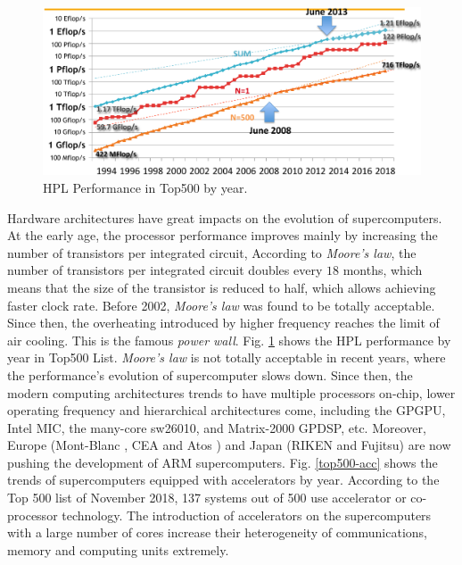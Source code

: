 \begin{figure}[t]
	\centering
	\includegraphics[width=0.99\linewidth]{fig/top500_2.pdf}
	\caption{HPL Performance in Top500 by year.}
	\label{hpc_evaluate}
\end{figure}

Hardware architectures have great impacts on the evolution of supercomputers. At the early age, the processor performance improves mainly by increasing the number of transistors per integrated circuit, According to \textit{Moore's law}, the number of transistors per integrated circuit doubles every $18$ months, which means that the size of the transistor is reduced to half, which allows achieving faster clock rate. Before 2002, \textit{Moore's law} was found to be totally acceptable. Since then, the overheating introduced by higher frequency reaches the limit of air cooling. This is the famous \textit{power wall}. Fig. \ref{hpc_evaluate} shows the HPL performance by year in Top500 List. \textit{Moore's law} is not totally acceptable in recent years, where the performance's evolution of supercomputer slows down. Since then, the modern computing architectures  trends to have multiple processors on-chip, lower operating frequency and hierarchical architectures come, including the GPGPU, Intel MIC, the many-core sw26010, and Matrix-2000 GPDSP, etc. Moreover, Europe (Mont-Blanc \cite{rajovic2016mont}, CEA and Atos \cite{ceaarm}) and Japan (RIKEN and Fujitsu) \cite{japanarm} are now pushing the development of ARM supercomputers. Fig. \ref{top500-acc} shows the trends of supercomputers equipped with accelerators by year. According to the Top 500 list of November 2018, 137 systems out of 500 use accelerator or co-processor technology. The introduction of accelerators on the supercomputers with a large number of cores increase their heterogeneity of communications, memory and computing units extremely.



